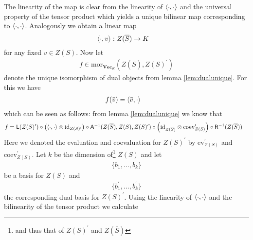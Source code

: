The linearity of the map is clear from the linearity of $\Braket{\cdot,\cdot}$ and the universal property of the tensor product which yields a unique bilinear map corresponding to $\Braket{\cdot,\cdot}$. Analogously we obtain a linear map
\begin{align*}
  \Braket{\cdot,v}
  \colon
  Z(\overline{S})
  &\to
  K
\end{align*}
for any fixed $v \in Z(S)$. Now let
\begin{align*}
  f
  \in
  \mathrm{mor}_{\mathbf{Vec}_{K}}
  \left(
    Z(\overline{S})
    ,
    Z(S)^{\prime}
  \right)
\end{align*}
denote the unique isomorphism of dual objects from lemma \ref{lem:dualunique}. For this we have
\begin{align*}
  f(\bar{v})
  &=
  \Braket{\bar{v},\cdot}
\end{align*}
which can be seen as follows: from lemma \ref{lem:dualunique} we know that
\begin{align*}
  f
  &=
  \mathsf{L}(Z(S)^{\prime})
  \circ
  \left(
    \Braket{\cdot,\cdot}
    \otimes
    \mathrm{id}_{Z(S)^{\prime}}
  \right)
  \circ
  \mathsf{A}^{-1}(Z(\overline{S}),Z(S),Z(S)^{\prime})
  \circ
  \left(
    \mathrm{id}_{Z(\overline{S})}
    \otimes
    \mathrm{coev}_{Z(S)}^{\prime}
  \right)
  \circ
  \mathsf{R}^{-1}(Z(\overline{S}))
\end{align*}
Here we denoted the evaluation and coevaluation for $Z(S)^{\prime}$ by $\mathrm{ev}_{Z(S)}^{\prime}$ and $\mathrm{coev}_{Z(S)}^{\prime}$. Let $k$ be the dimension of\footnote{and thus that of $Z(S)^{\prime}$ and $Z(\overline{S})$} $Z(S)$ and let
\begin{align*}
  \lbrace
    b_{1}
    ,
    \ldots
    ,
    b_{k}
  \rbrace
\end{align*}
be a basis  for $Z(S)$ and
\begin{align*}
  \lbrace
    b_{1}^{\prime}
    ,
    \ldots
    ,
    b_{k}^{\prime}
  \rbrace
\end{align*}
the corresponding dual basis for $Z(S)^{\prime}$. Using the linearity of $\Braket{\cdot,\cdot}$ and the bilinearity of the tensor product we calculate
